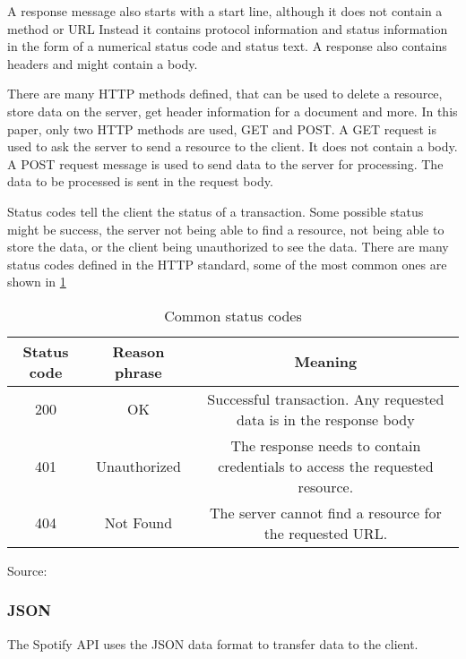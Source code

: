 A response message also starts with a start line, although it does not contain a method or URL
Instead it contains protocol information and status information in the form of a numerical
status code and status text.\cite[48]{gourley2002http}
A response also contains headers and might contain a body.\cite[52]{gourley2002http}

There are many HTTP methods defined, that can be used to delete a resource, store
data on the server, get header information for a document and more.\cite[48]{gourley2002http}
In this paper, only two HTTP methods are used, GET and POST.
A GET request is used to ask the server to send a resource to the client.
It does not contain a body.\cite[48]{gourley2002http}
A POST request message is used to send data to the server for processing. The data to be
processed is sent in the request body.\cite[48]{gourley2002http}

Status codes tell the client the status of a transaction.
Some possible status might be success, the server not being able to find a resource, not
being able to store the data, or the client being unauthorized to see the data\cite[49]{gourley2002http}.
There are many status codes defined in the HTTP standard,
some of the most common ones are shown in \ref{tbl:Common status codes}

\begin{table}[H]
 \caption{Common status codes}
 \label{tbl:Common status codes}
\begin{tabular}{|| c | c | c ||} 
 \hline
 Status code & Reason phrase & Meaning \\ [0.5ex]
 \hline\hline
 200 & OK & Successful transaction. Any requested data is in the response body \\ [1ex]
 \hline
 401 & Unauthorized & The response needs to contain credentials to access the requested resource. \\ [1ex]
 \hline
 404 & Not Found & The server cannot find a resource for the requested URL. \\ [1ex]
 \hline
\end{tabular}
Source: \cite[50]{gourley2002http}
\end{table}

\subsubsection{JSON}

The Spotify API uses the \ac{JSON} data format to transfer data to the client\cite{SpotifyWebAPI}.

